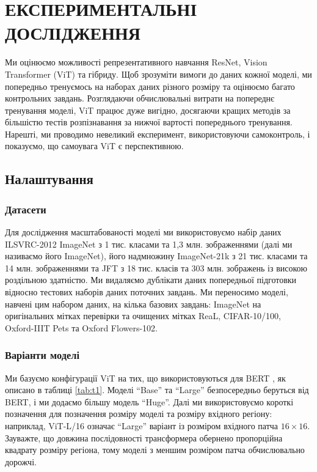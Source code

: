 \chapter{ЕКСПЕРИМЕНТАЛЬНІ ДОСЛІДЖЕННЯ}
Ми оцінюємо можливості репрезентативного навчання
ResNet, Vision Transformer (ViT) та гібриду.
Щоб зрозуміти вимоги до даних кожної моделі, ми попередньо
тренуємось на наборах даних різного розміру та оцінюємо багато
контрольних завдань. Розглядаючи обчислювальні витрати на
попереднє тренування моделі, ViT працює дуже вигідно,
досягаючи кращих методів за більшістю тестів розпізнавання
за нижчої вартості попереднього тренування. Нарешті, ми проводимо
невеликий експеримент, використовуючи самоконтроль,
і показуємо, що самоувага ViT є перспективною.

\section{Налаштування}
\subsection{Датасети}
Для дослідження масштабованості моделі ми використовуємо
набір даних ILSVRC-2012 ImageNet з 1 тис. класами та 1,3 млн. зображеннями
(далі ми називаємо його ImageNet), його надмножину ImageNet-21k
з 21 тис. класами та 14 млн. зображеннями та JFT з 18 тис. 
класів та 303 млн. зображень із високою роздільною здатністю.
Ми видаляємо дублікати даних попередньої підготовки
відносно тестових наборів даних поточних завдань.
Ми переносимо моделі, навчені цим набором даних, на кілька базових завдань:
ImageNet на оригінальних мітках перевірки та очищених мітках ReaL,
CIFAR-10/100, Oxford-IIIT Pets та Oxford Flowers-102.

\subsection{Варіанти моделі}
Ми базуємо конфігурації ViT на тих, що використовуються для
BERT \cite{bert}, як описано в таблиці \ref{tab:t1}.
Моделі ``Base'' та ``Large'' безпосередньо беруться від BERT,
і ми додаємо більшу модель ``Huge''. Далі ми використовуємо
короткі позначення для позначення розміру моделі
та розміру вхідного регіону: наприклад, ViT-L/16 означає ``Large''
варіант із розміром вхідного патча $16 \times 16$.
Зауважте, що довжина послідовності трансформера
обернено пропорційна квадрату розміру регіона,
тому моделі з меншим розміром патча обчислювально дорожчі.

